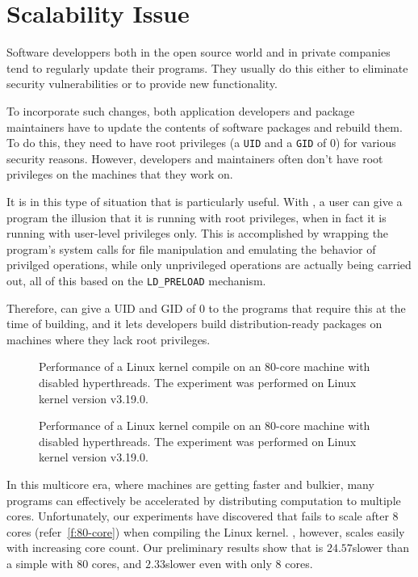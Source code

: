 \section{\fakeroot Scalability Issue}
\label{s:problem}

Software developpers both in the open source world
and in private companies tend to
regularly update their programs. They usually do this
either to eliminate security vulnerabilities or to
provide new functionality.

To incorporate such changes, both
application developers and
package maintainers have to
update the contents of software packages
and rebuild them.
%
To do this, they need
to have root privileges (a \verb|UID| and a \verb|GID| of 0)
for various security reasons.
However, developers and maintainers often don't have
root privileges on the machines that they work on.

It is in this type of situation that \fakeroot
is particularly useful. With \fakeroot,
a user can give a program the
illusion that it is running with root privileges,
when in fact it is running with user-level privileges only.
This is accomplished by wrapping the program's system calls
for file manipulation and
emulating the behavior of privilged operations,
while only unprivileged operations are actually being carried out,
all of this based on the \verb|LD_PRELOAD| mechanism.

Therefore, \fakeroot can give a UID and GID
of 0 to the programs that require this at the
time of building, and it lets developers build distribution-ready
packages on machines where they lack root privileges.

\begin{figure}[t!]
\centering

\caption{Performance of a Linux kernel compile on an 80-core
  machine with disabled hyperthreads. The experiment was
  performed on Linux kernel version v3.19.0.}
\label{f:80-core}
\end{figure}

\begin{figure}[t!]
\centering

\caption{Performance of a Linux kernel compile on an 80-core
  machine with disabled hyperthreads. The experiment was
  performed on Linux kernel version v3.19.0.}
\label{f:120-core}
\end{figure}

In this multicore era, where machines are getting
faster and bulkier, many programs can effectively be
accelerated by distributing computation to multiple cores.
Unfortunately, our experiments have discovered that
\fakeroot fails to scale after 8 cores (refer~\autoref{f:80-core})
when compiling the Linux kernel. \make, however,
scales easily with increasing core count.
Our preliminary results show
that \fakeroot is $24.57$\x slower
than a simple \make with 80 cores, 
and $2.33$\x slower even
with only 8 cores.

